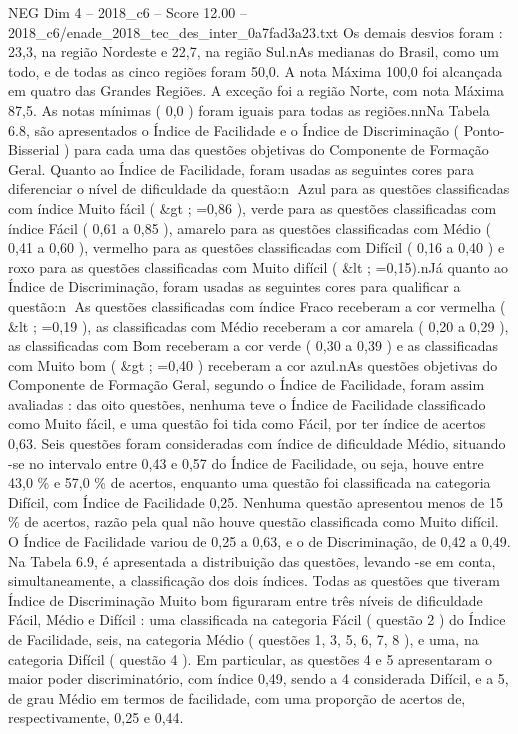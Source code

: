 \begin{textsample}{NEG Dim 4 – 2018\_c6 – Score 12.00 – 2018\_c6/enade\_2018\_tec\_des\_inter\_0a7fad3a23.txt}
Os demais desvios foram : 23,3, na região Nordeste e 22,7, na região Sul.nAs medianas do Brasil, como um todo, e de todas as cinco regiões foram 50,0.
A nota Máxima 100,0 foi alcançada em quatro das Grandes Regiões.
A exceção foi a região Norte, com nota Máxima 87,5.
As notas mínimas ( 0,0 ) foram iguais para todas as regiões.nnNa Tabela 6.8, são apresentados o Índice de Facilidade e o Índice de Discriminação ( Ponto-Bisserial ) para cada uma das questões objetivas do Componente de Formação Geral.
Quanto ao Índice de Facilidade, foram usadas as seguintes cores para diferenciar o nível de dificuldade da questão:n Azul para as questões classificadas com índice Muito fácil ( \&gt ; =0,86 ), verde para as questões classificadas com índice Fácil ( 0,61 a 0,85 ), amarelo para as questões classificadas com Médio ( 0,41 a 0,60 ), vermelho para as questões classificadas com Difícil ( 0,16 a 0,40 ) e roxo para as questões classificadas com Muito difícil ( \&lt ; =0,15).nJá quanto ao Índice de Discriminação, foram usadas as seguintes cores para qualificar a questão:n As questões classificadas com índice Fraco receberam a cor vermelha ( \&lt ; =0,19 ), as classificadas com Médio receberam a cor amarela ( 0,20 a 0,29 ), as classificadas com Bom receberam a cor verde ( 0,30 a 0,39 ) e as classificadas com Muito bom ( \&gt ; =0,40 ) receberam a cor azul.nAs questões objetivas do Componente de Formação Geral, segundo o Índice de Facilidade, foram assim avaliadas : das oito questões, nenhuma teve o Índice de Facilidade classificado como Muito fácil, e uma questão foi tida como Fácil, por ter índice de acertos 0,63.
Seis questões foram consideradas com índice de dificuldade Médio, situando -se no intervalo entre 0,43 e 0,57 do Índice de Facilidade, ou seja, houve entre 43,0 \% e 57,0 \% de acertos, enquanto uma questão foi classificada na categoria Difícil, com Índice de Facilidade 0,25.
Nenhuma questão apresentou menos de 15 \% de acertos, razão pela qual não houve questão classificada como Muito difícil.
O Índice de Facilidade variou de 0,25 a 0,63, e o de Discriminação, de 0,42 a 0,49.
Na Tabela 6.9, é apresentada a distribuição das questões, levando -se em conta, simultaneamente, a classificação dos dois índices.
Todas as questões que tiveram Índice de Discriminação Muito bom figuraram entre três níveis de dificuldade Fácil, Médio e Difícil : uma classificada na categoria Fácil ( questão 2 ) do Índice de Facilidade, seis, na categoria Médio ( questões 1, 3, 5, 6, 7, 8 ), e uma, na categoria Difícil ( questão 4 ).
Em particular, as questões 4 e 5 apresentaram o maior poder discriminatório, com índice 0,49, sendo a 4 considerada Difícil, e a 5, de grau Médio em termos de facilidade, com uma proporção de acertos de, respectivamente, 0,25 e 0,44.

\end{textsample}
